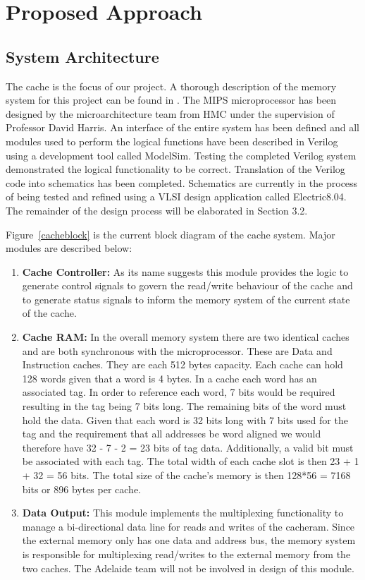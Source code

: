 \section{Proposed Approach}

\subsection{System Architecture}

The cache is the focus of our project. A thorough description of
the memory system for this project can be found in
\cite{hmcmemsys}. The MIPS microprocessor has been designed by the
microarchitecture team from HMC under the supervision of Professor David
Harris. An interface of the entire system has been defined and all modules used to perform
the logical functions have been described in Verilog using a development tool
called ModelSim. Testing the completed Verilog system demonstrated the logical
functionality to be correct. Translation of the Verilog code into schematics
has been completed. Schematics are currently in the process of being
tested and refined using a VLSI design application called Electric8.04. The
remainder of the design process will be elaborated in Section 3.2.

Figure~\ref{cacheblock} is the current block diagram of
the cache system. Major modules are described below:
\begin{enumerate}
\item \textbf{Cache Controller: }As its name suggests this module provides the logic to generate control signals to govern the read/write behaviour of the cache and to generate status signals to inform the memory system of the current state of the cache.
\item \textbf{Cache RAM: }In the overall memory system there are two identical caches and are both synchronous with the microprocessor. These are Data and Instruction caches. They are each 512 bytes capacity. Each cache can hold 128 words given that a word is 4 bytes. In a cache each word has an associated tag. In order to reference each word, 7 bits would be required resulting in the tag being 7 bits long. The remaining bits of the word must hold the data. Given that each word is 32 bits long with 7 bits used for the tag and the requirement that all addresses be word aligned we would therefore have  32 - 7 - 2 = 23 bits of tag data. Additionally, a valid bit must be associated with each tag. The total width of each cache slot is then 23 + 1 + 32 = 56 bits. The total size of the cache's memory is then 128*56 = 7168 bits or 896 bytes per cache.
\item \textbf{Data Output: }This module implements the multiplexing functionality to manage a bi-directional data line for reads and writes of the cacheram. Since the external memory only has one data and address bus, the memory system is responsible for multiplexing read/writes to the external memory from the two caches. The Adelaide team will not be involved in design of this module.
\end{enumerate}

